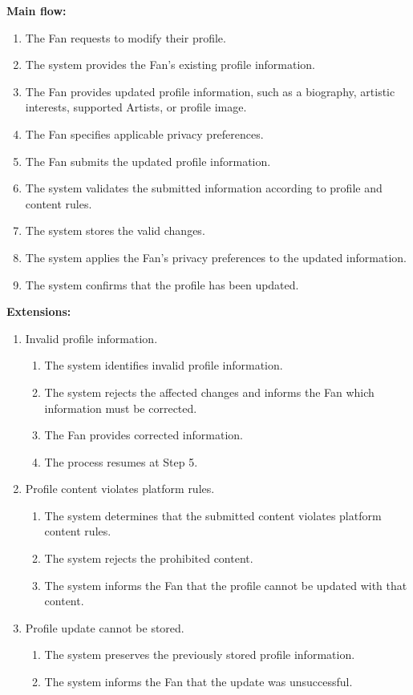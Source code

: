 \documentclass[11pt]{report}
\begin{document}
{\bfseries Main flow:}
\begin{enumerate}
    \item The Fan requests to modify their profile.
    \item The system provides the Fan's existing profile information.
    \item The Fan provides updated profile information, such as a biography, artistic interests, supported Artists, or profile image.
    \item The Fan specifies applicable privacy preferences.
    \item The Fan submits the updated profile information.
    \item The system validates the submitted information according to profile and content rules.
    \item The system stores the valid changes.
    \item The system applies the Fan's privacy preferences to the updated information.
    \item The system confirms that the profile has been updated.
\end{enumerate}

{\bfseries Extensions:}
\begin{enumerate}
    \item[6a.] Invalid profile information.
    \begin{enumerate}
        \item[6a1.] The system identifies invalid profile information.
        \item[6a2.] The system rejects the affected changes and informs the Fan which information must be corrected.
        \item[6a3.] The Fan provides corrected information.
        \item[6a4.] The process resumes at Step 5.
    \end{enumerate}

    \item[6b.] Profile content violates platform rules.
    \begin{enumerate}
        \item[6b1.] The system determines that the submitted content violates platform content rules.
        \item[6b2.] The system rejects the prohibited content.
        \item[6b3.] The system informs the Fan that the profile cannot be updated with that content.
    \end{enumerate}

    \item[7a.] Profile update cannot be stored.
    \begin{enumerate}
        \item[7a1.] The system preserves the previously stored profile information.
        \item[7a2.] The system informs the Fan that the update was unsuccessful.
    \end{enumerate}
\end{enumerate}
\end{document}
